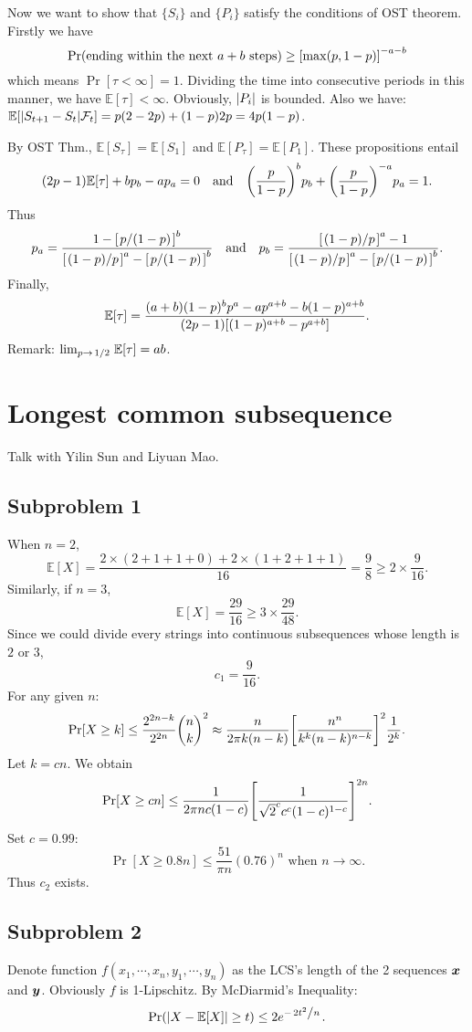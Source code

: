\documentclass{article}
\begin{document}
Now we want to show that $\{S_i\}$ and $\{P_i\}$ satisfy the conditions of OST theorem. Firstly we have 
\[
	\Pr(\text{ending within the next $a+b$ steps})\ge \qty[\max(p,1-p)]^{-a-b}
\] which means $\Pr[\tau<\infty]=1$.
Dividing the time into consecutive periods in this manner, we have $\mathbb{E}[\tau]<\infty$. Obviously, $\qty|P_i|$ is bounded. Also we have:  $\mathbb{E}[\qty|S_{t+1}-S_t|\mathcal{F}_t]=p(2-2p)+(1-p)2p=4p(1-p)$.

By OST Thm., $\mathbb{E}[S_\tau]=\mathbb{E}[S_1]$ and  $\mathbb{E}[P_\tau]=\mathbb{E}[P_1]$. These propositions entail
\[
	(2p-1)\mathbb{E}[\tau]+bp_b-ap_a=0
	\qand
	\qty(\frac{p}{1-p})^{b}p_b+\qty(\frac{p}{1-p})^{-a}p_a=1
.\] 
Thus 
\[
    p_a=
	\frac
	{1-\qty[\flatfrac{p}{(1-p)}]^b}
	{\qty[\flatfrac{(1-p)}{p}]^{a}-\qty[\flatfrac{p}{(1-p)}]^b}
	\qand
	p_b=
	\frac
	{\qty[\flatfrac{(1-p)}{p}]^{a}-1}
	{\qty[\flatfrac{(1-p)}{p}]^{a}-\qty[\flatfrac{p}{(1-p)}]^b}
.\] 
Finally,
\[
	\mathbb{E}[\tau]=\frac{(a+b)(1-p)^bp^a-ap^{a+b}-b(1-p)^{a+b}}{(2p-1)\qty[(1-p)^{a+b}-p^{a+b}]}
.\] 
Remark: $\lim_{p\to\flatfrac{1}{2}}\mathbb{E}[\tau]=ab$.

\section{Longest common subsequence}
Talk with Yilin Sun and Liyuan Mao.
\subsection*{Subproblem 1}
When $n=2$,  
\[
	\mathbb{E}[X]
	=
	\frac{2\times(2+1+1+0)+2\times(1+2+1+1)}{16}
	=
	\frac{9}{8}\ge 2\times\frac{9}{16}
.\]
Similarly, if $n=3$, 
\[
	\mathbb{E}[X]=\frac{29}{16}\ge 3\times\frac{29}{48}
.\]
Since we could divide every strings into continuous subsequences whose length is $2$ or $3$, 
\[
	c_1=\frac{9}{16}
.\]
For any given $n$:
\[
	\Pr[X\ge k]
	\le 
	\frac{2^{2n-k}}{2^{2n}}{n \choose k}^2
	\approx
	{\frac{n}{2\pi k(n-k)}}\qty[\frac{n^n}{k^k(n-k)^{n-k}}]^2\frac{1}{2^k}
.\]
Let $k=cn$. We obtain
\[
    \Pr[X\ge cn]
	\le
	\frac{1}{2\pi nc(1-c)}\qty[\frac{1}{\sqrt{2}^cc^c(1-c)^{1-c}}]^{2n}
.\] 
Set $c=0.99$:
\[
    \Pr[X\ge 0.8n]
	\le
	\frac{51}{\pi n}(0.76)^n
	\text{ when } n\to\infty
.\] 
Thus $c_2$ exists.

\subsection*{Subproblem 2}

Denote function $f(x_1,\cdots,x_n,y_1,\cdots,y_n)$ as the LCS's length of the 2 sequences $\boldsymbol{x}$ and $\boldsymbol{y}$.
Obviously $f$ is 1-Lipschitz.
By McDiarmid's Inequality:
\[
	\Pr(\abs{X-\mathbb{E}[X]}\ge t)\le 2e^{-\flatfrac{2t^2}{n}}
.\] 
\end{document}
